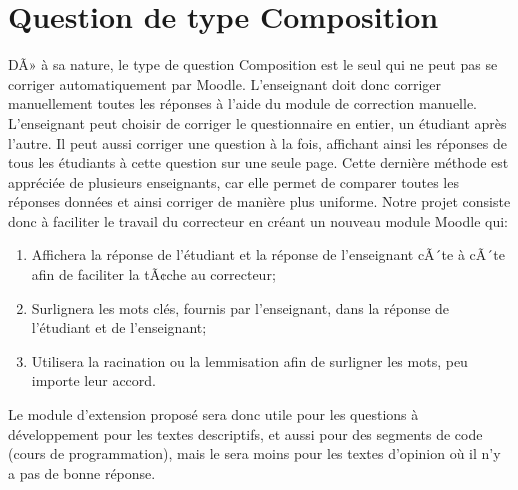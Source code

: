 \section{Question de type Composition}

DÃ» \`a sa nature, le type de question Composition est le seul qui ne peut pas se corriger automatiquement par Moodle.
L'enseignant doit donc corriger manuellement toutes les r\'eponses \`a l'aide du module de correction manuelle.
L'enseignant peut choisir de corriger le questionnaire en entier, un \'etudiant apr\`es l'autre.
Il peut aussi corriger une question \`a la fois, affichant ainsi les r\'eponses de tous les \'etudiants \`a cette question sur une seule page.
Cette derni\`ere m\'ethode est appr\'eci\'ee de plusieurs enseignants, car elle permet de comparer toutes les r\'eponses donn\'ees et ainsi corriger de mani\`ere plus uniforme.
Notre projet consiste donc \`a faciliter le travail du correcteur en cr\'eant un nouveau module Moodle qui:
\begin{enumerate}
  \item Affichera la r\'eponse de l'\'etudiant et la r\'eponse de l'enseignant cÃ´te \`a cÃ´te afin de faciliter la tÃ¢che au correcteur;
  \item Surlignera les mots cl\'es, fournis par l'enseignant, dans la r\'eponse de l'\'etudiant et de l'enseignant;
  \item Utilisera la racination ou la lemmisation afin de surligner les mots, peu importe leur accord.
\end{enumerate}
Le module d'extension propos\'e sera donc utile pour les questions \`a d\'eveloppement pour les textes descriptifs, et aussi pour des segments de code (cours  de programmation), mais le sera moins pour les textes d'opinion o\`u il n'y a pas de \og bonne \fg{} r\'eponse.
